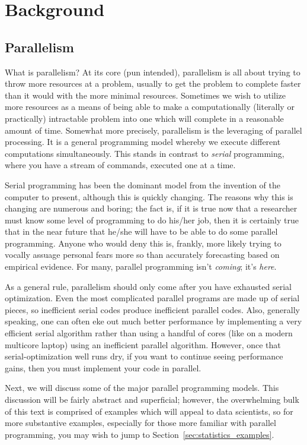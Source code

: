 \chapter{Background}
\label{sec:bg}


\section{Parallelism}
What is parallelism?  At its core (pun intended), parallelism is all about trying to throw more resources at a problem, usually to get the problem to complete faster than it would with the more minimal resources.  Sometimes we wish to utilize more resources as a means of being able to make a computationally (literally or practically) intractable problem into one which will complete in a reasonable amount of time.  Somewhat more precisely, parallelism is the leveraging of parallel processing.  It is a general programming model whereby we execute different computations simultaneously.  This stands in contrast to \emph{serial} programming, where you have a stream of commands, executed one at a time.

Serial programming has been the dominant model from the invention of the computer to present, although this is quickly changing.  The reasons why this is changing are numerous and boring; the fact is, if it is true now that a researcher must know some level of programming to do his/her job, then it is certainly true that in the near future that he/she will have to be able to do some parallel programming.  Anyone who would deny this is, frankly, more likely trying to vocally assuage personal fears more so than accurately forecasting based on empirical evidence.  For many, parallel programming isn't \emph{coming}; it's \emph{here}.  

As a general rule, parallelism should only come after you have exhausted serial optimization.  Even the most complicated parallel programs are made up of serial pieces, so inefficient serial codes produce inefficient parallel codes.  Also, generally speaking, one can often eke out much better performance by implementing a very efficient serial algorithm rather than using a handful of cores (like on a modern multicore laptop) using an inefficient parallel algorithm.  However, once that serial-optimization well runs dry, if you want to continue seeing performance gains, then you must implement your code in parallel.  

Next, we will discuss some of the major parallel programming models.  This discussion will be fairly abstract and superficial; however, the overwhelming bulk of this text is comprised of examples which will appeal to data scientists, so for more substantive examples, especially for those more familiar with parallel programming, you may wish to jump to Section~\ref{sec:statistics_examples}.



